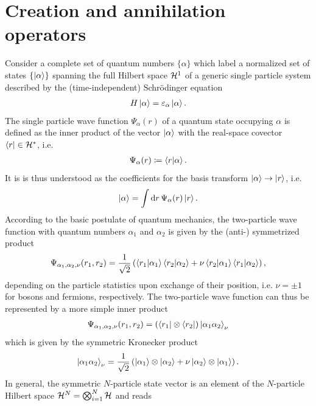 \section{Creation and annihilation operators}
\label{sec:creation_and_annihilation_operators}
Consider a complete set of quantum numbers $\{\alpha\}$ which label a normalized set of states $\{\ket{\alpha}\}$ spanning the full Hilbert space $\mathcal{H}^1$ of a generic single particle system described by the (time-independent) Schrödinger equation
\begin{align}
    H \ket{\alpha} = \varepsilon_\alpha\ket{\alpha}.
\end{align}
The single particle wave function $\Psi_\alpha(r)$ of a quantum state occupying $\alpha$ is defined as the inner product of the vector $\ket{\alpha}$ with the real-space covector $\bra{r}\in\mathcal{H}^*$, i.e.
\begin{align}
    \Psi_\alpha(r) \coloneqq \braket{r|\alpha}.
\end{align}
It is is thus understood as the coefficients for the basis transform $\ket{\alpha}\rightarrow\ket{r}$, i.e.
\begin{align}
    \ket{\alpha} = \int{\rm d}{r}\, \Psi_\alpha(r) \ket{r}.
\end{align}
According to the basic postulate of quantum mechanics, the two-particle wave function with quantum numbers $\alpha_1$ and $\alpha_2$ is given by the (anti-) symmetrized product
\begin{align}
    \Psi_{\alpha_1,\alpha_2,\nu}(r_1,r_2) = \frac1{\sqrt2}\left(\braket{r_1|\alpha_1}\braket{r_2|\alpha_2} + \nu\braket{r_2|\alpha_1}\braket{r_1|\alpha_2}\right),
\end{align}
depending on the particle statistics upon exchange of their position, i.e. $\nu=\pm1$ for bosons and fermions, respectively.
The two-particle wave function can thus be represented by a more simple inner product
\begin{align}
    \Psi_{\alpha_1,\alpha_2,\nu}(r_1,r_2) = \left(\bra{r_1}\otimes\bra{r_2}\right)\ket{\alpha_1 \alpha_2}_\nu
\end{align}
which is given by the symmetric Kronecker product
\begin{align}
    \ket{\alpha_1 \alpha_2}_\nu = \frac1{\sqrt2}\left(\ket{\alpha_1}\otimes\ket{\alpha_2} + \nu\ket{\alpha_2}\otimes\ket{\alpha_1}\right).
\end{align}
In general, the symmetric $N$-particle state vector is an element of the $N$-particle Hilbert space $\mathcal{H}^N = \bigotimes_{i=1}^N\mathcal{H}$ and reads
